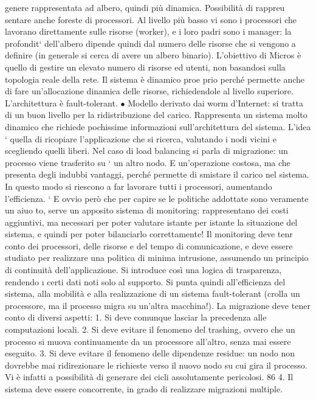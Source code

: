 genere rappresentata ad albero, quindi più dinamica. Possibilità di rappreu
sentare anche foreste di processori. Al livello più basso vi sono i processori
che lavorano direttamente sulle risorse (worker), e i loro padri sono i manager: la profondit` dell'albero dipende
quindi dal numero delle risorse che
si vengono a definire (in generale si cerca di avere un albero binario). L'obiettivo di Micros è quello di gestire un
elevato numero di risorse ed utenti,
non basandosi sulla topologia reale della rete. Il sistema è dinamico proe
prio perché permette anche di fare un'allocazione dinamica delle risorse,
richiedendole al livello superiore. L'architettura è fault-tolerant.
$\bullet$ Modello derivato dai worm d'Internet: si tratta di un buon livello per
la ridistribuzione del carico. Rappresenta un sistema molto dinamico che
richiede pochissime informazioni sull'architettura del sistema. L'idea `
quella di ricopiare l'applicazione che si ricerca, valutando i nodi vicini e
scegliendo quelli liberi.
Nel caso di load balancing si parla di migrazione: un processo viene trasferito su
`
un altro nodo. E un'operazione costosa, ma che presenta degli indubbi vantaggi,
perché permette di smistare il carico nel sistema. In questo modo si riescono a
far lavorare tutti i processori, aumentando l'efficienza.
`
E ovvio però che per capire se le politiche addottate sono veramente un aiuo
to, serve un apposito sistema di monitoring: rappresentano dei costi aggiuntivi,
ma necessari per poter valutare istante per istante la situazione del sistema, e
quindi per poter bilanciarlo correttamente! Il monitoring deve tenr conto dei
processori, delle risorse e del tempo di comunicazione, e deve essere studiato per
realizzare una politica di minima intrusione, assumendo un principio di continuità dell'applicazione. Si introduce così
una logica di trasparenza, rendendo
\i{}
certi dati noti solo al supporto. Si punta quindi all'efficienza del sistema, alla
mobilità e alla realizzazione di un sistema fault-tolerant (crolla un processore,
ma il processo migra su un'altra macchina!).
La migrazione deve tener conto di diversi aspetti:
1. Si deve comunque lasciar la precedenza alle computazioni locali.
2. Si deve evitare il fenomeno del trashing, ovvero che un processo si muova
continuamente da un processore all'altro, senza mai essere eseguito.
3. Si deve evitare il fenomeno delle dipendenze residue: un nodo non dovrebbe
mai ridirezionare le richieste verso il nuovo nodo su cui gira il processo.
Vi è infatti a possibilità di generare dei cicli assolutamente pericolosi.
86
4. Il sistema deve essere concorrente, in grado di realizzare migrazioni multiple.
